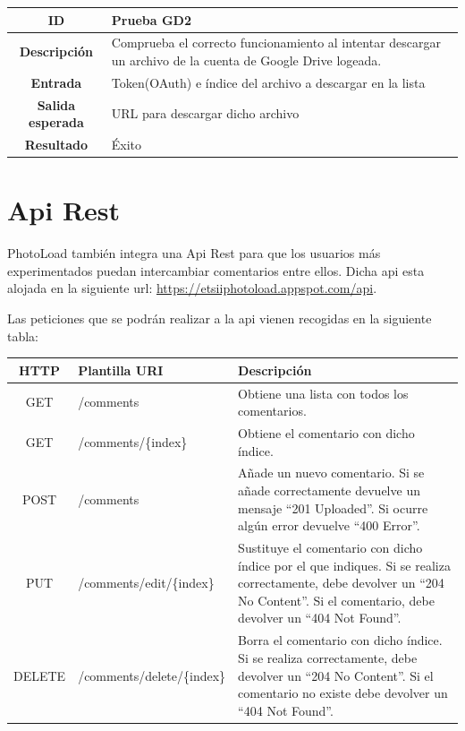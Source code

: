 \documentclass{scrartcl}
\begin{document}
\begin{tabularx}{14cm}{|c|X|}
	\hline \textbf{ID} & Prueba GD2 \\ 
	\hline \textbf{Descripción} & Comprueba el correcto funcionamiento al intentar descargar un archivo de la cuenta de Google Drive logeada.\\	 
	\hline  \textbf{Entrada}		& Token(OAuth) e índice del archivo a descargar en la lista \\ 
	\hline  \textbf{Salida esperada}			& URL para descargar dicho archivo \\
	\hline  \textbf{Resultado}			& Éxito \\
	\hline 
\end{tabularx} 
\section{Api Rest}\label{cap:apiRest}
PhotoLoad también integra una Api Rest para que los usuarios más experimentados puedan intercambiar comentarios entre ellos. Dicha api esta alojada en la siguiente url: \href{https://etsiiphotoload.appspot.com/api}{https://etsiiphotoload.appspot.com/api}. 

Las peticiones que se podrán realizar a la api vienen recogidas en la siguiente tabla:
\\

\begin{tabularx}{15cm}{|c|X|X|}
	\hline \textbf{HTTP} & \textbf{Plantilla URI} &\textbf{Descripción}\\ 
	\hline GET & /comments & Obtiene una lista con todos los comentarios.\\	 
	\hline  GET		& /comments/\{index\}& Obtiene el comentario con dicho índice.\\ 
	\hline  POST			& /comments & Añade un nuevo comentario.
	Si se añade correctamente devuelve un mensaje “201 Uploaded”.
	Si ocurre algún error devuelve “400 Error”.\\
	\hline  PUT			& /comments/edit/\{index\}	& Sustituye el comentario con dicho índice por el que indiques.
	Si se realiza correctamente, debe devolver un “204 No Content”. Si el comentario, debe devolver un “404 Not Found”.\\
	\hline  DELETE			& /comments/delete/\{index\}	& Borra el comentario con dicho índice.
	Si se realiza correctamente, debe devolver un “204 No Content”. Si el comentario no existe debe devolver un “404 Not Found”.\\
	\hline 
\end{tabularx} 
\vspace*{0.3in}
\end{document}
